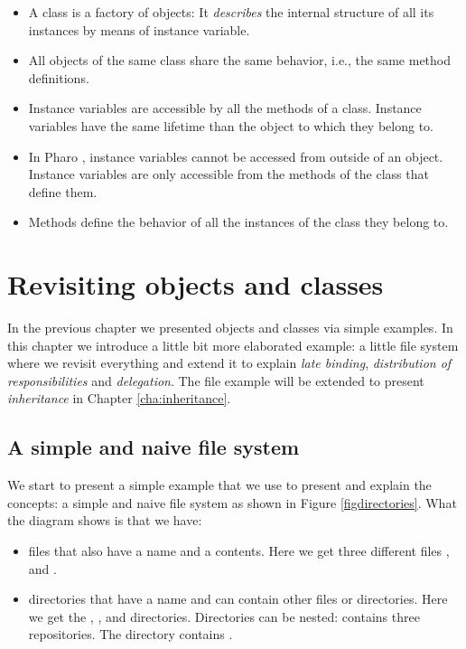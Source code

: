 \documentclass[10pt,twoside,english]{_support/latex/sbabook/sbabook}
\begin{document}
\begin{itemize}
\item A class is a factory of objects: It \textit{describes} the internal structure of all its instances by means of instance variable. 
\item All objects of the same class share the same behavior, i.e., the same method definitions.
\item Instance variables are accessible by all the methods of a class. Instance variables have the same lifetime than the object to which they belong to.
\item In Pharo , instance variables cannot be accessed from outside of an object. Instance variables are only accessible from the methods of the class that define them.
\item Methods define the behavior of all the instances  of the class they belong to.
\end{itemize}
\chapter{Revisiting objects and classes}
In the previous chapter we presented objects and classes via simple examples. In this chapter we introduce a little bit more elaborated example: a little file system where we revisit everything and extend it to explain \textit{late binding}, \textit{distribution of responsibilities} and \textit{delegation}. The file example will be extended to present \textit{inheritance} in Chapter \ref{cha:inheritance}.
\section{A simple and naive file system}
We start to present a simple example that we use to present and explain the concepts: a simple and naive file system as shown in Figure \ref{figdirectories}. 
What the diagram shows is that we have:

\begin{itemize}
\item files that also have a name and a contents. Here we get three different files ,  and .
\item directories that have a name and can contain other files or directories. Here we get the , ,  and  directories. Directories can be nested:  contains three repositories. The  directory contains . 
\end{itemize}
\end{document}
